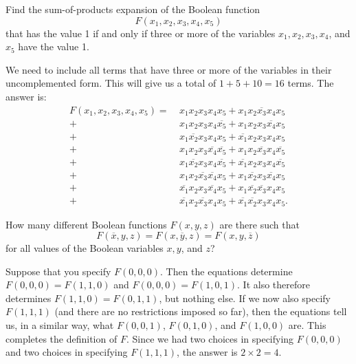 \begin{exercise}
	Find the sum-of-products expansion of the Boolean function \[ F(x_1, x_2, x_3, x_4, x_5) \] that has the value 1 if and only if three or more of the variables \( x_1, x_2, x_3, x_4 \), and \( x_5 \) have the value 1.
\end{exercise}
\begin{solution}
	We need to include all terms that have three or more of the variables in their uncomplemented form. This will give us a total of \( 1 + 5 + 10 = 16 \) terms. The answer is:
	\begin{align*}
		F(x_1, x_2, x_3, x_4, x_5) = \ & x_1 x_2 x_3 x_4 x_5+ x_1 x_2 \overline{x_3} x_4 x_5\\
		+ \ & x_1 x_2 x_3 x_4 \overline{x_5} + x_1 x_2 x_3 \overline{x_4} x_5  \\
		+ \ & x_1 \overline{x_2} x_3 x_4 x_5 + \overline{x_1} x_2 x_3 x_4 x_5 \\
		+ \ & x_1 x_2 x_3 \overline{x_4} \overline{x_5} + x_1 x_2 \overline{x_3} x_4 \overline{x_5} \\
		+ \ & x_1 \overline{x_2} x_3 x_4 \overline{x_5} + \overline{x_1} x_2 x_3 x_4 \overline{x_5} \\
		+ \ & x_1 x_2 \overline{x_3} \overline{x_4} x_5 + x_1 \overline{x_2} x_3 \overline{x_4} x_5 \\
		+ \ & \overline{x_1} x_2 x_3 \overline{x_4} x_5 + x_1 \overline{x_2} \overline{x_3} x_4 x_5 \\
		+ \ & \overline{x_1} x_2 \overline{x_3} x_4 x_5 + \overline{x_1} \overline{x_2} x_3 x_4 x_5.
	\end{align*}
\end{solution}
\begin{exercise}
	How many different Boolean functions \( F(x, y, z) \) are there such that 
	\[ F(\overline{x}, y, z) = F(x, \overline{y}, z) = F(x, y, \overline{z}) \]
	for all values of the Boolean variables \( x, y \), and \( z \)?
\end{exercise}
\begin{solution}
	Suppose that you specify \( F(0, 0, 0) \). Then the equations determine \( F(0, 0, 0) = 
    F(1, 1, 0) \) and \( F(0, 0, 0) = F(1, 0, 1) \). It also therefore determines 
    \( F(1, 1, 0) = F(0, 1, 1) \), but nothing else. If we now also specify \( F(1, 1, 1) \)
     (and there are no restrictions imposed so far), then the equations tell us, in a similar way, 
     what \( F(0, 0, 1) \), \( F(0, 1, 0) \), and \( F(1, 0, 0) \) are. This completes the definition 
     of \( F \). Since we had two choices in specifying \( F(0, 0, 0) \) and two choices in 
     specifying \( F(1, 1, 1) \), the answer is \( 2 \times 2 = 4 \).
	
\end{solution}

